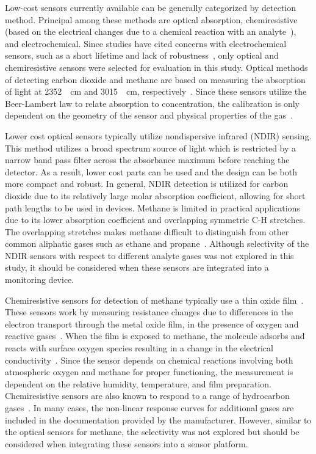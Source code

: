 \documentclass[sensors,article,submit,moreauthors,pdftex]{Definitions/mdpi}
\begin{document}
		Low-cost sensors currently available can be generally categorized by detection method.
		Principal among these methods are optical absorption, chemiresistive (based on the electrical changes due to a chemical reaction with an analyte~\cite{wetchakun_semiconducting_2011}), and electrochemical.
		Since studies have cited concerns with electrochemical sensors, such as a short lifetime and lack of robustness~\cite{neri_first_2015}, only optical and chemiresistive sensors were selected for evaluation in this study.
		Optical methods of detecting carbon dioxide and methane are based on measuring the absorption of light at \SI{2352}{\per\centi\meter} and \SI{3015}{\per\centi\meter}, respectively~\cite{frodl_high-precision_2006,zhu_one_2012}.
		Since these sensors utilize the Beer-Lambert law to relate absorption to concentration, the calibration is only dependent on the geometry of the sensor and physical properties of the gas~\cite{bacsik_ftir_2004}.
		
		Lower cost optical sensors typically utilize nondispersive infrared (NDIR) sensing.
		This method utilizes a broad spectrum source of light which is restricted by a narrow band pass filter across the absorbance maximum before reaching the detector.
		As a result, lower cost parts can be used and the design can be both more compact and robust.
		In general, NDIR detection is utilized for carbon dioxide due to its relatively large molar absorption coefficient, allowing for short path lengths to be used in devices.
		Methane is limited in practical applications due to its lower absorption coefficient and overlapping symmetric C-H stretches.
		The overlapping stretches makes methane difficult to distinguish from other common aliphatic gases such as ethane and propane~\cite{coblentz_society_inc._evaluated_????}.
		Although selectivity of the NDIR sensors with respect to different analyte gases was not explored in this study, it should be considered when these sensors are integrated into a monitoring device. 
		
		Chemiresistive sensors for detection of methane typically use a thin oxide film~\cite{neri_first_2015}.
		These sensors work by measuring resistance changes due to differences in the electron transport through the metal oxide film, in the presence of oxygen and reactive gases~\cite{albert_cross-reactive_2000}.
		When the film is exposed to methane, the molecule adsorbs and reacts with surface oxygen species resulting in a change in the electrical conductivity~\cite{wang_metal_2010,prudenziati_thick-film_1986}.
		Since the sensor depends on chemical reactions involving both atmospheric oxygen and methane for proper functioning, the measurement is dependent on the relative humidity, temperature, and film preparation.
		Chemiresistive sensors are also known to respond to a range of hydrocarbon gases~\cite{sekhar_development_2016}. In many cases, the non-linear response curves for additional gases are included in the documentation provided by the manufacturer.
		However, similar to the optical sensors for methane, the selectivity was not explored but should be considered when integrating these sensors into a sensor platform.
		
\end{document}
